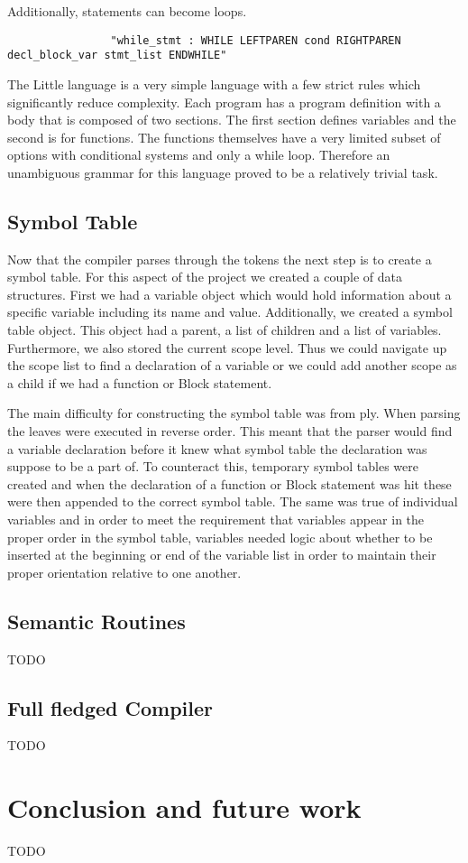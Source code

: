 \documentclass[12pt]{article}
\begin{document}
           Additionally, statements can become loops.
           \begin{verbatim}
				"while_stmt : WHILE LEFTPAREN cond RIGHTPAREN decl_block_var stmt_list ENDWHILE"
           \end{verbatim}
           
    		
    		The Little language is a very simple language with a few strict rules which significantly reduce complexity.  Each program has a program definition with a body that is composed of two sections.  The first section defines variables and the second is for functions.  The functions themselves have a very limited subset of options with conditional systems and only a while loop.  Therefore an unambiguous grammar for this language proved to be a relatively trivial task.  
    		

    	\subsection{Symbol Table}
    		Now that the compiler parses through the tokens the next step is to create a symbol table.  For this aspect of the project we created a couple of data structures.  First we had a variable object which would hold information about a specific variable including its name and value.  Additionally, we created a symbol table object.  This object had a parent, a list of children and a list of variables.  Furthermore, we also stored the current scope level.  Thus we could navigate up the scope list to find a declaration of a variable or we could add another scope as a child if we had a function or Block statement.  
    		
    		The main difficulty for constructing the symbol table was from ply.  When parsing the leaves were executed in reverse order.  This meant that the parser would find a variable declaration before it knew what symbol table the declaration was suppose to be a part of.   To counteract this, temporary symbol tables were created and when the declaration of a function or Block statement was hit these were then appended to the correct symbol table.  The same was true of individual variables and in order to meet the requirement that variables appear in the proper order in the symbol table, variables needed logic about whether to be inserted at the beginning or end of the variable list in order to maintain their proper orientation relative to one another.

    	\subsection{Semantic Routines}
    		TODO

    	\subsection{Full fledged Compiler}
    		TODO

    \section{Conclusion and future work}	
			TODO	    
    
 
\end{document}
